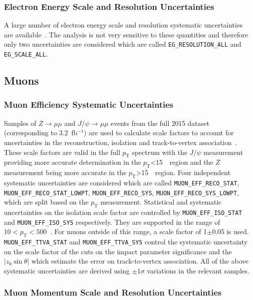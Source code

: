 \subsubsection{Electron Energy Scale and Resolution Uncertainties}

A large number of electron energy scale and resolution systematic uncertainties
are available~\cite{EgammaCalibTWiki}. The analysis is not very sensitive to
these quantities and therefore only two uncertainties are considered which are
called \texttt{EG\_RESOLUTION\_ALL} and \texttt{EG\_SCALE\_ALL}.

\subsection{Muons}

\subsubsection{Muon Efficiency Systematic Uncertainties}

Samples of $Z\to\mu\mu$ and $J/\psi\to\mu\mu$ events from the full 2015
dataset (corresponding to 3.2~fb$^{-1}$) are used to calculate scale factors to
account for uncertainties in the reconstruction, isolation and track-to-vertex
association~\cite{muonTWiki}. These scale factors are valid in the full
$p_{\mathrm{T}}$ spectrum with the $J/\psi$ measurement providing more accurate
determination in the $p_{\mathrm{T}}$<15~\GeV\ region and the $Z$ measurement
being more accurate in the $p_{\mathrm{T}}$>15~\GeV\ region. Four independent
systematic uncertainties are considered which are called
\texttt{MUON\_EFF\_RECO\_STAT}, \texttt{MUON\_EFF\_RECO\_STAT\_LOWPT},
\texttt{MUON\_EFF\_RECO\_SYS}, \texttt{MUON\_EFF\_RECO\_SYS\_LOWPT}, which are
split based on the $p_{\mathrm{T}}$ measurement. Statistical and systematic
uncertainties on the isolation scale factor are controlled by
\texttt{MUON\_EFF\_ISO\_STAT} and \texttt{MUON\_EFF\_ISO\_SYS} respectively.
They are supported in the range of $10 < p_{\mathrm{T}} < 500$~\GeV. For muons
outside of this range, a scale factor of 1$\pm$0.05 is used.
\texttt{MUON\_EFF\_TTVA\_STAT} and \texttt{MUON\_EFF\_TTVA\_SYS} control the
systematic uncertainty on the scale factor of the cuts on the impact parameter
significance and the $|z_0\sin\theta|$ which estimate the error on
track-to-vertex association. All of the above systematic uncertainties are
derived using $\pm 1\sigma$ variations in the relevant samples.

\subsubsection{Muon Momentum Scale and Resolution Uncertainties}

